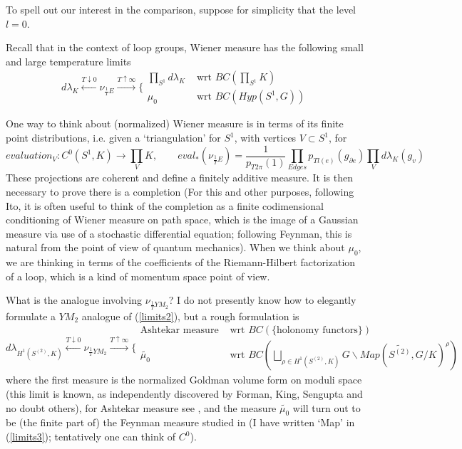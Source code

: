 \documentclass{amsart}
\theoremstyle{conjecture}
\theoremstyle{definition}
\theoremstyle{question}
\theoremstyle{questions}
\theoremstyle{remark}
\theoremstyle{remarks}
\theoremstyle{example}
\numberwithin{equation}{section}
\begin{document}
To spell out our interest in the comparison, suppose for simplicity that the level $l=0$. 

Recall that in the context of loop groups, Wiener measure has the following small and large temperature limits
\begin{equation}\label{limits2}d\lambda_K \stackrel{T\downarrow 0}{\leftarrow} \nu_{\frac 1T E}\stackrel{T\uparrow \infty}{\rightarrow} \{ \begin{matrix} \prod_{S^1}d\lambda_K& \text{ wrt } BC(\prod_{S^1} K)\\ \mu_0& \text{ wrt } BC(Hyp(S^1,G)) \end{matrix}\end{equation}

One way to think about (normalized) Wiener measure is in terms of its finite point distributions, i.e. given a `triangulation' for $S^1$, with vertices $V\subset S^1$, for
$$evaluation_V: C^0(S^1,K) \to \prod_V K,  \qquad  eval_*(\nu_{\frac 1T E})=\frac{1}{p_{T2\pi}(1)}\prod_{Edges}p_{Tl(e)}(g_{\partial e})\prod_V d\lambda_K(g_v)$$
These projections are coherent and define a finitely additive measure. It is then necessary to prove there is a completion (For this and other purposes, following Ito, it is often useful to think of the completion as a finite codimensional conditioning of Wiener measure on path space, which is the image of a Gaussian measure via use of a stochastic
differential equation; following Feynman, this is natural from the point of view of quantum mechanics). When we think about $\mu_0$, we are thinking in terms 
of the coefficients of the Riemann-Hilbert factorization of a loop, which is a kind of momentum space point of view.

What is the analogue involving $\nu_{\frac 1T YM_2}$? I do not presently know how to elegantly formulate a $YM_2$ analogue of (\ref{limits2}), but a rough formulation is
\begin{equation}\label{limits3}d\lambda_{H^1(S^{(2)},K)} \stackrel{T\downarrow 0}{\leftarrow} \nu_{\frac 1T YM_2}\stackrel{T\uparrow \infty}{\rightarrow} \{ \begin{matrix} \text{Ashtekar measure}& \text{ wrt } BC(\{\text{holonomy functors}\}) \\ \widetilde{\mu_0}& \text{ wrt } BC(\bigsqcup_{\rho\in H^1(S^{(2)},K)}G\backslash Map(\widetilde{S^{(2)}},G/K)^{\rho})  \end{matrix}\end{equation}
where the first measure is the normalized Goldman volume form on moduli space (this limit is known, as independently discovered by Forman, King,
Sengupta and no doubt others), for Ashtekar measure see \cite{Ashtekar}, and the measure $\widetilde {\mu_0}$ will turn out to be (the finite part of) the Feynman measure studied in \cite{GKR} (I have written `Map' in (\ref{limits3}); tentatively one can think of $C^0$).
\end{document}
